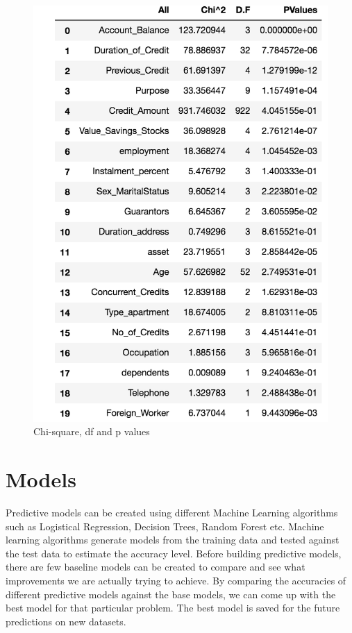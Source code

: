 \documentclass[sigconf]{acmart}
\begin{document}
\begin{figure}[htb]
  \centering
  \includegraphics[width=1.0\columnwidth]{images/Figure19.png}
  \caption{Chi-square, df and p values}
  \label{fig:Figure19} 
\end{figure}

\section{Models}

Predictive models can be created using different Machine Learning algorithms such as Logistical Regression, Decision Trees, Random Forest etc. Machine learning algorithms generate models from the training data and tested against the test data to estimate the accuracy level. Before building predictive models, there are few baseline models can be created to compare and see what improvements we are actually trying to achieve. By comparing the accuracies of different predictive models against the base models, we can come up with the best model for that particular problem. The best model is saved for the future predictions on new datasets.
\end{document}
